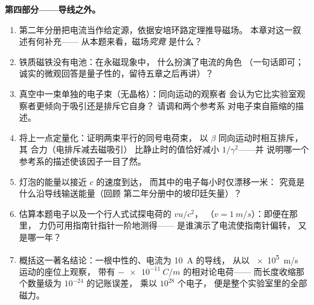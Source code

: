 \begin{problem}
\medskip\noindent\textbf{第四部分——导线之外。}
\begin{enumerate}[resume]
  \item 第二年分册把电流当作给定源，依据安培环路定理推导磁场。
        本章对这一叙述有何补充——
        从本题来看，磁场\emph{究竟}
        是什么？
  \item 铁质磁铁没有电池：在永磁现象中，
        什么扮演了电流的角色
        （一句话即可；诚实的微观回答是量子性的，留待五章之后再讲）？
  \item 真空中一束单独的电子束（无晶格）：同向运动的观察者
        会认为它比实验室观察者更倾向于吸引还是排斥它自身？
        请调和两个参考系
        对电子束自箍缩的描述。
  \item 将上一点定量化：证明两束平行的同号电荷束，
        以 $\beta$ 同向运动时相互排斥，其
        合力（电排斥减去磁吸引）
        比静止时的值恰好减小 $1/\gamma^2$——并
        说明哪一个参考系的描述使该因子一目了然。
  \item 灯泡的能量以接近 $c$ 的速度到达，
        而其中的电子每小时仅漂移一米：
        究竟是什么沿导线输送能量（回顾
        第二年分册中的坡印廷矢量）？
  \item 估算本题电子以及一个行人式试探电荷的 $vu/c^2$，
        （$v = \qty{1}{m/s}$）：即便在那里，
        力仍可用指南针指针一阶地测得——
        是谁演示了电流使指南针偏转，
        又是哪一年？
  \item 概括这一著名结论：一根中性的、电流为 \qty{10}{A} 的导线，
        从以 \qty{e5}{m/s} 运动的座位上观察，
        带有 $-\qty{e-11}{C/m}$ 的相对论电荷——
        而长度收缩那个数量级为 $10^{-24}$ 的记账误差，
        乘以 $10^{28}$ 个电子，
        便是整个实验室里的全部磁力。
\end{enumerate}
\end{problem}
